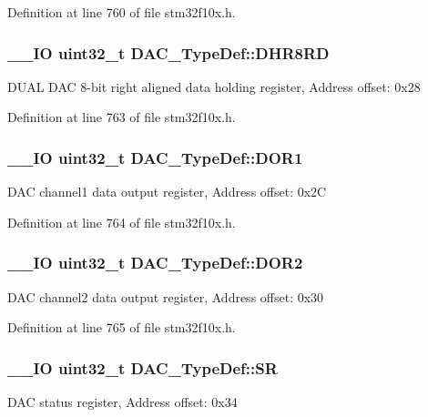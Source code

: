 Definition at line 760 of file stm32f10x.\-h.

\hypertarget{struct_d_a_c___type_def_a03f8d95bbf0ce3a53cb79506d5bf995a}{
\subsubsection[{D\-H\-R8\-R\-D}]{\setlength{\rightskip}{0pt plus 5cm}\-\_\-\-\_\-\-I\-O {\bf uint32\-\_\-t} D\-A\-C\-\_\-\-Type\-Def\-::\-D\-H\-R8\-R\-D}}\label{struct_d_a_c___type_def_a03f8d95bbf0ce3a53cb79506d5bf995a}
D\-U\-A\-L D\-A\-C 8-\/bit right aligned data holding register, Address offset\-: 0x28 

Definition at line 763 of file stm32f10x.\-h.

\hypertarget{struct_d_a_c___type_def_a50b4f0b0d2a376f729c8d7acf47864c3}{
\subsubsection[{D\-O\-R1}]{\setlength{\rightskip}{0pt plus 5cm}\-\_\-\-\_\-\-I\-O {\bf uint32\-\_\-t} D\-A\-C\-\_\-\-Type\-Def\-::\-D\-O\-R1}}\label{struct_d_a_c___type_def_a50b4f0b0d2a376f729c8d7acf47864c3}
D\-A\-C channel1 data output register, Address offset\-: 0x2\-C 

Definition at line 764 of file stm32f10x.\-h.

\hypertarget{struct_d_a_c___type_def_a1bde8391647d6422b39ab5ba4f13848b}{
\subsubsection[{D\-O\-R2}]{\setlength{\rightskip}{0pt plus 5cm}\-\_\-\-\_\-\-I\-O {\bf uint32\-\_\-t} D\-A\-C\-\_\-\-Type\-Def\-::\-D\-O\-R2}}\label{struct_d_a_c___type_def_a1bde8391647d6422b39ab5ba4f13848b}
D\-A\-C channel2 data output register, Address offset\-: 0x30 

Definition at line 765 of file stm32f10x.\-h.

\hypertarget{struct_d_a_c___type_def_a1d3fd83d6ed8b2d90b471db4509b0e70}{
\subsubsection[{S\-R}]{\setlength{\rightskip}{0pt plus 5cm}\-\_\-\-\_\-\-I\-O {\bf uint32\-\_\-t} D\-A\-C\-\_\-\-Type\-Def\-::\-S\-R}}\label{struct_d_a_c___type_def_a1d3fd83d6ed8b2d90b471db4509b0e70}
D\-A\-C status register, Address offset\-: 0x34 

